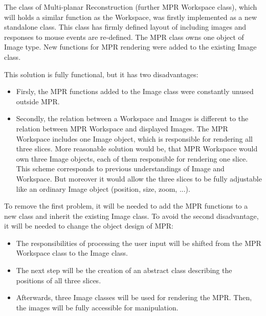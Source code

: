 The class of Multi-planar Reconstruction (further MPR Workspace class), which will holds a similar function as the Workspace, was firstly implemented as a new standalone class. This class has firmly defined layout of including images and responses to mouse events are re-defined. The MPR class owns one object of Image type. New functions for MPR rendering were added to the existing Image class.

This solution is fully functional, but it has two disadvantages:

\begin{itemize}
\item Firsly, the MPR functions added to the Image class were constantly unused outside MPR.
\item Secondly, the relation between a Workspace and Images is different to the relation between MPR Workspace and displayed Images. The MPR Workspace includes one Image object, which is responsible for rendering all three slices. More reasonable solution would be, that MPR Workspace would own three Image objects, each of them responsible for rendering one slice. This scheme corresponds to previous understandings of Image and Workspace. But moreover it would allow the three slices to be fully adjustable like an ordinary Image object (position, size, zoom, ...). 
\end{itemize}

To remove the first problem, it will be needed to add the MPR functions to a new class and inherit the existing Image class. To avoid the second disadvantage, it will be needed to change the object design of MPR:

\begin{itemize}
\item The responsibilities of processing the user input will be shifted from the MPR Workspace class to the Image class.
\item The next step will be the creation of an abstract class describing the positions of all three slices.
\item Afterwards, three Image classes will be used for rendering the MPR. Then, the images will be fully accessible for manipulation.
\end{itemize}



